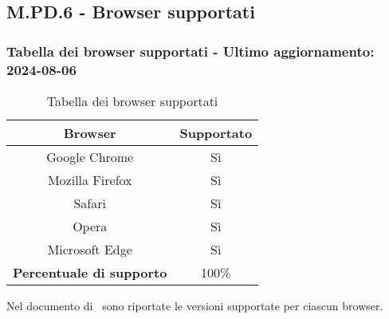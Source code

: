 \subsection{M.PD.6 - Browser supportati}

\subsubsection*{Tabella dei browser supportati - Ultimo aggiornamento: 2024-08-06}

\begin{table}[H]
  \centering
  \begin{tabular}{|c|c|}
      \hline
      \textbf{Browser} & \textbf{Supportato} \\
      \hline
      Google Chrome & Sì \\
      \hline
      Mozilla Firefox & Sì \\
      \hline
      Safari & Sì \\
      \hline
      Opera & Sì \\
      \hline
      Microsoft Edge & Sì \\
      \hline
      \textbf{Percentuale di supporto} & 100\% \\
      \hline 
  \end{tabular}
  \caption{Tabella dei browser supportati}
\end{table}

\par Nel documento di \ST\ sono riportate le versioni supportate per ciascun browser.
